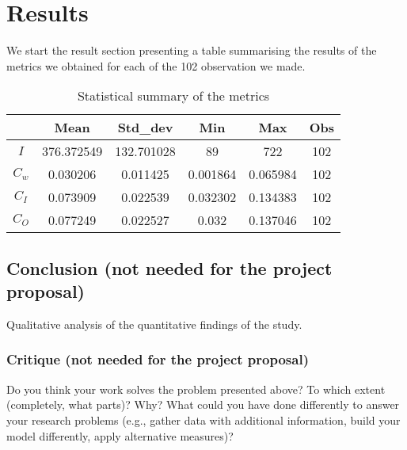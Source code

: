\documentclass[12pt, a4paper]{article}
\begin{document}
\section{Results}
\label{results}
We start the result section presenting a table summarising the results of the metrics we obtained for each of the 102 observation we made. \\
\begin{table}[h]
        \centering
        \begin{tabular}{|c|c|c|c|c|c|}
                \hline
                & Mean & Std\_dev & Min & Max & Obs \\
                \hline
                $I$  &    376.372549 & 132.701028 & 89 &722 &  102 \\
                \hline
                $C_w$  &  0.030206  &  0.011425 & 0.001864 & 0.065984 & 102 \\
                \hline
                $C_I$ & 0.073909 & 0.022539 & 0.032302 & 0.134383 & 102 \\
                \hline
                $C_O$ & 0.077249 & 0.022527 & 0.032 & 0.137046 & 102 \\
                \hline
        \end{tabular}
        \caption{Statistical summary of the metrics}
\end{table}



\subsection{Conclusion (not needed for the project proposal)}
Qualitative analysis of the quantitative findings of the study.

\subsubsection{Critique (not needed for the project proposal)}
\label{critique-not-needed-for-the-project-proposal}

Do you think your work solves the problem presented above? To which
extent (completely, what parts)? Why? What could you have done
differently to answer your research problems (e.g., gather data with
additional information, build your model differently, apply alternative
measures)?
\end{document}

